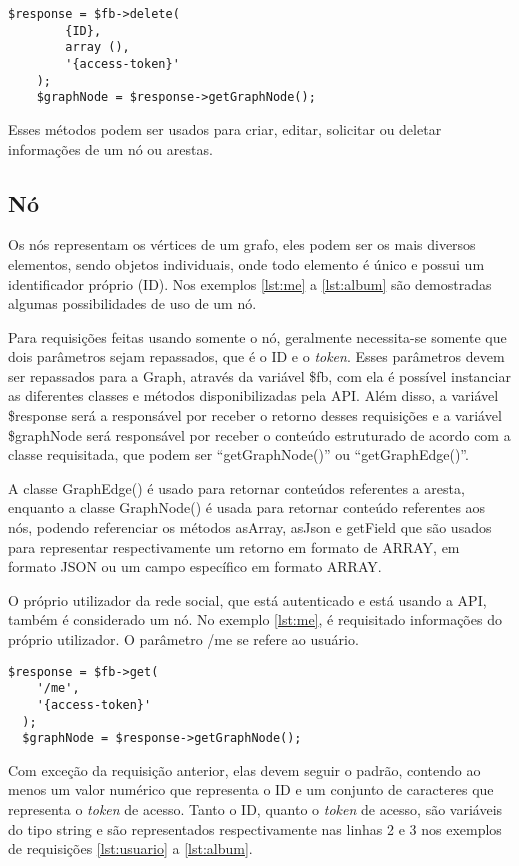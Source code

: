 \begin{lstlisting}[caption={Requsição DELETE},label={lst:requisicao10}]
	$response = $fb->delete(
    	{ID},
   		array (),
    	'{access-token}'
  	);
	$graphNode = $response->getGraphNode();
\end{lstlisting}

Esses métodos podem ser usados para criar, editar, solicitar ou deletar informações de um nó ou arestas.

\subsection{Nó}
Os nós representam os vértices de um grafo, eles podem ser os mais diversos elementos, sendo objetos individuais, onde todo elemento é único e possui um identificador próprio (ID). Nos exemplos \ref{lst:me} a \ref{lst:album} são demostradas algumas possibilidades de uso de um nó.

Para requisições feitas usando somente o nó, geralmente necessita-se somente que dois parâmetros sejam repassados, que é o ID e o \textit{token}. Esses parâmetros devem ser repassados para a Graph, através da variável \$fb, com ela é possível instanciar as diferentes classes e métodos disponibilizadas pela API. Além disso, a variável \$response será a responsável por receber o retorno desses requisições e a variável \$graphNode será responsável por receber o conteúdo estruturado de acordo com a classe requisitada, que podem ser ``getGraphNode()'' ou ``getGraphEdge()''.

A classe GraphEdge() é usado para retornar conteúdos referentes a aresta, enquanto a classe GraphNode() é usada para retornar conteúdo referentes aos nós, podendo referenciar os métodos asArray, asJson e getField que são usados para representar respectivamente um retorno em formato de ARRAY, em formato JSON ou um campo específico em formato ARRAY.

O próprio utilizador da rede social, que está autenticado e está usando a API, também é considerado um nó. No exemplo \ref{lst:me}, é requisitado informações do próprio utilizador. O parâmetro /me se refere ao usuário.

\begin{lstlisting}[caption={Requisitar informações do próprio usuário},label={lst:me}]
  $response = $fb->get(
    '/me',
    '{access-token}'
  );
  $graphNode = $response->getGraphNode();
\end{lstlisting}

Com exceção da requisição anterior, elas devem seguir o padrão, contendo ao menos um valor numérico que representa o ID e um conjunto de caracteres que representa o \textit{token} de acesso. Tanto o ID, quanto o \textit{token} de acesso, são variáveis do tipo string e são representados respectivamente nas linhas 2 e 3 nos exemplos de requisições \ref{lst:usuario} a \ref{lst:album}.

